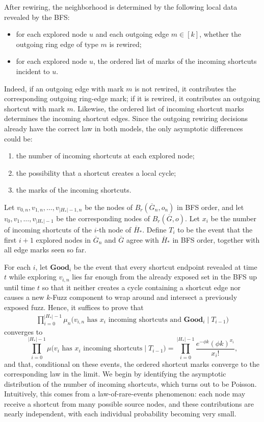 \documentclass[10pt]{amsart}
\begin{document}
After rewiring, the neighborhood is determined by the following local data revealed by the BFS:
\begin{itemize}
    \item for each explored node $u$ and each outgoing edge $m\in[k]$, whether
    the outgoing ring edge of type $m$ is rewired;
    \item for each explored node $u$, the ordered list of marks of the incoming
    shortcuts incident to $u$.
\end{itemize}
Indeed, if an outgoing edge with mark $m$ is not rewired, it contributes the corresponding outgoing ring-edge mark; if it is rewired, it contributes an outgoing shortcut with mark $m$. Likewise, the ordered list of incoming shortcut marks determines the incoming shortcut edges. Since the outgoing rewiring decisions already have the correct law in both models, the only asymptotic differences could be:
\begin{enumerate}
    \item the number of incoming shortcuts at each explored node;
    \item the possibility that a shortcut creates a local cycle;
    \item the marks of the incoming shortcuts. \label{shortcut-mark}
\end{enumerate}

Let $v_{0,n},v_{1,n},\dots,v_{|H_*|-1,n}$ be the nodes of
$B_r(\overline{G}_n,o_n)$ in BFS order, and let
$v_0,v_1,\dots,v_{|H_*|-1}$ be the corresponding nodes of
$B_r(\overline{G},o)$. Let $x_i$ be the number of incoming shortcuts of the
$i$-th node of $\overline{H}_*$. Define $T_i$ to be the event that the first
$i+1$ explored nodes in $\overline{G}_n$ and $\overline{G}$ agree with
$\overline{H}_*$ in BFS order, together with all edge marks seen so far.

For each $i$, let $\mathbf{Good}_i$ be the event that every shortcut endpoint
revealed at time $t$ while exploring $v_{i,n}$ lies far enough from the already exposed set in the BFS up until time $t$ so that it neither creates a cycle containing a shortcut edge nor causes a
new $k$-Fuzz component to wrap around and intersect a previously exposed fuzz.
Hence, it suffices to prove that
\begin{align}
\prod_{i=0}^{|H_*|-1}
\mu_n\big(v_{i,n}\text{ has }x_i\text{ incoming shortcuts and }\mathbf{Good}_i
\mid T_{i-1}\big)
\label{ws-goal}
\end{align}
converges to
\[
\prod_{i=0}^{|H_*|-1}\mu\big(v_i\text{ has }x_i\text{ incoming shortcuts}\mid
T_{i-1}\big)
=
\prod_{i=0}^{|H_*|-1}\frac{e^{-\phi k}(\phi k)^{x_i}}{x_i!},
\]
and that, conditional on these events, the ordered shortcut marks converge to the corresponding law in the limit. We begin by identifying the asymptotic distribution of the number of incoming shortcuts, which turns out to be Poisson. Intuitively, this comes from a law-of-rare-events phenomenon: each node may receive a shortcut from many possible source nodes, and these contributions are nearly independent, with each individual probability becoming very small. 
\end{document}
